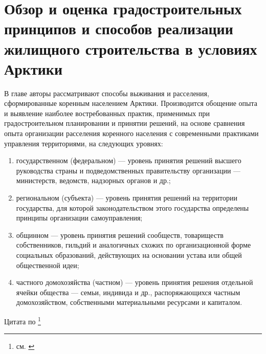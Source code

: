 \chapter{Обзор и оценка градостроительных принципов и способов реализации жилищного строительства в условиях Арктики}
В главе авторы рассматривают способы выживания и расселения, сформированные коренным населением Арктики.
Производится обощение опыта и выявление наиболее востребованных практик, применимых при градостроительном планировании и принятии решений,
на основе сравнения опыта организации расселения коренного населения с современными практиками управления территориями, на следующих уровнях:
\begin{enumerate}[1)]
    \item государственном (федеральном) — уровень принятия решений высшего руководства страны и подведомственных правительству организации — министерств, ведомств, надзорных органов и др.;
    \item региональном (субъекта) — уровень принятия решений на территории государства, для которой законодательством этого государства определены принципы организации самоуправления;
    \item общинном — уровень принятия решений сообществ, товариществ собственников, гильдий и аналогичных схожих по организационной форме
    социальных образований, действующих на основании устава или общей общественной идеи;
    \item частного домохозяйства (частном) — уровень принятия решения отдельной ячейки общества — семьи, индивида и др., распоряжающихся частным
    домохозяйством, собственными материальными ресурсами и капиталом.
\end{enumerate}
Цитата по \footnote{см. \cite{up_Avdotin_GradProektirovanie,law_RU_GradoCodex,nomads_Golovnev_NomadsTechAtlas}}



